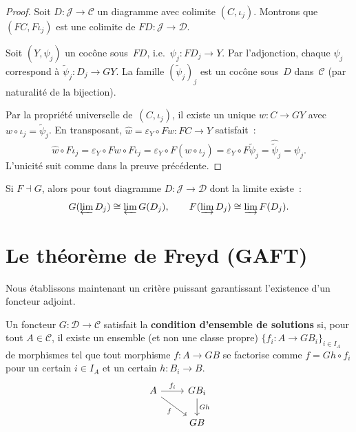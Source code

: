 \begin{proof}
Soit $D\colon\mathcal{J}\to\mathcal{C}$ un diagramme avec colimite
$(C,\iota_j)$. Montrons que $(FC,F\iota_j)$ est une colimite de
$FD\colon\mathcal{J}\to\mathcal{D}$.

Soit $(Y,\psi_j)$ un cocône sous~$FD$, i.e.\ $\psi_j\colon FD_j\to Y$.
Par l'adjonction, chaque $\psi_j$ correspond à
$\tilde{\psi}_j\colon D_j\to GY$.
La famille $(\tilde{\psi}_j)_j$ est un cocône sous~$D$ dans~$\mathcal{C}$
(par naturalité de la bijection).

Par la propriété universelle de~$(C,\iota_j)$, il existe un unique
$w\colon C\to GY$ avec $w\circ\iota_j = \tilde{\psi}_j$.
En transposant, $\hat{w} = \varepsilon_Y\circ Fw\colon FC\to Y$ satisfait~:
\[
    \hat{w}\circ F\iota_j
    = \varepsilon_Y\circ Fw\circ F\iota_j
    = \varepsilon_Y\circ F(w\circ\iota_j)
    = \varepsilon_Y\circ F\tilde{\psi}_j
    = \hat{\tilde{\psi}}_j = \psi_j.
\]
L'unicité suit comme dans la preuve précédente.
\end{proof}

\begin{corollaire}\label{cor:adj-hom-lim}
Si $F\dashv G$, alors pour tout diagramme $D\colon\mathcal{J}\to\mathcal{D}$
dont la limite existe~:
\[
    G(\varprojlim D_j) \cong \varprojlim G(D_j),
    \qquad
    F(\varinjlim D_j) \cong \varinjlim F(D_j).
\]
\end{corollaire}


\section{Le théorème de Freyd (GAFT)}\label{sec:freyd}

Nous établissons maintenant un critère puissant garantissant l'existence
d'un foncteur adjoint.

\begin{definition}\label{def:solution-set}
Un foncteur $G\colon\mathcal{D}\to\mathcal{C}$ satisfait la
\textbf{condition d'ensemble de solutions} si, pour tout $A\in\mathcal{C}$,
il existe un ensemble (et non une classe propre)
$\{f_i\colon A\to GB_i\}_{i\in I_A}$ de morphismes tel que tout morphisme
$f\colon A\to GB$ se factorise comme $f = Gh\circ f_i$ pour un certain
$i\in I_A$ et un certain $h\colon B_i\to B$.
\[
\begin{tikzcd}
A \arrow[r, "f_i"] \arrow[dr, "f"'] & GB_i \arrow[d, "Gh"] \\
& GB
\end{tikzcd}
\]
\end{definition}

